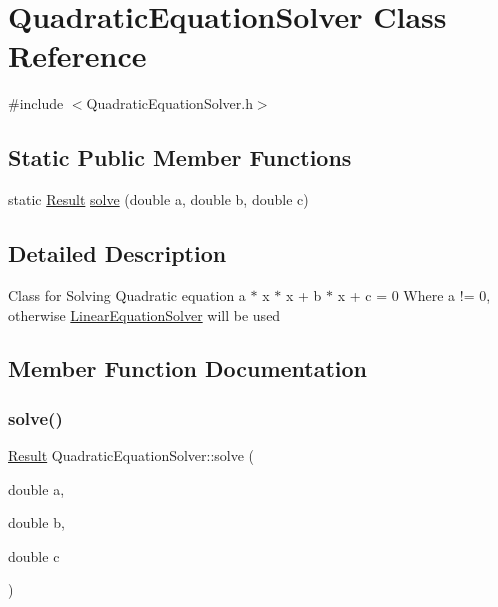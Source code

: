 \hypertarget{classQuadraticEquationSolver}{}\section{Quadratic\+Equation\+Solver Class Reference}
\label{classQuadraticEquationSolver}


{\ttfamily \#include $<$Quadratic\+Equation\+Solver.\+h$>$}

\subsection*{Static Public Member Functions}
\begin{DoxyCompactItemize}
\item 
static \hyperlink{classResult}{Result} \hyperlink{classQuadraticEquationSolver_a08cf28292f621591bf6a84ae757521af}{solve} (double a, double b, double c)
\end{DoxyCompactItemize}


\subsection{Detailed Description}
Class for Solving Quadratic equation a $\ast$ x $\ast$ x + b $\ast$ x + c = 0 Where a != 0, otherwise \hyperlink{classLinearEquationSolver}{Linear\+Equation\+Solver} will be used 

\subsection{Member Function Documentation}
\mbox{\label{classQuadraticEquationSolver_a08cf28292f621591bf6a84ae757521af}} 
\subsubsection{\texorpdfstring{solve()}{solve()}}
{\footnotesize\ttfamily \hyperlink{classResult}{Result} Quadratic\+Equation\+Solver\+::solve (\begin{DoxyParamCaption}\item[{double}]{a,  }\item[{double}]{b,  }\item[{double}]{c }\end{DoxyParamCaption})\hspace{0.3cm}{\ttfamily [static]}}


